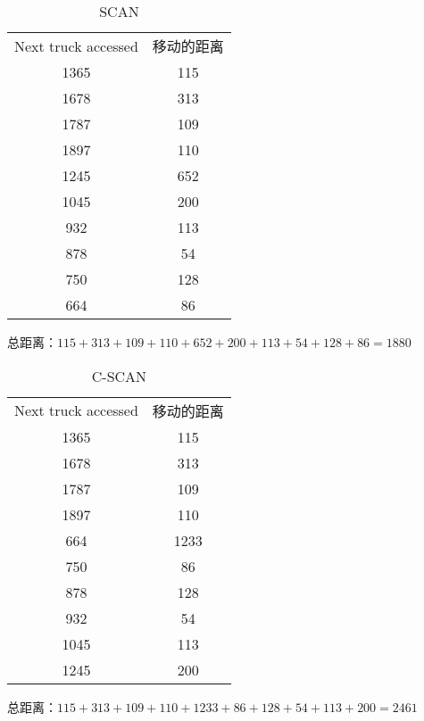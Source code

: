 \documentclass[UTF8]{ctexart}
\begin{document}
    \begin{table}[htb]
        \centering
        \caption{SCAN}
        \begin{tabular}{cc}
            \hline
            Next truck accessed&移动的距离\\
            1365&115\\
            1678&313\\
            1787&109\\
            1897&110\\
            1245&652\\
            1045&200\\
            932&113\\
            878&54\\
            750&128\\
            664&86\\
            \hline
        \end{tabular}
    \end{table}
    总距离：$115+313+109+110+652+200+113+54+128+86=1880$
    \clearpage
    \begin{table}[htb]
        \centering
        \caption{C-SCAN}
        \begin{tabular}{cc}
            \hline
            Next truck accessed&移动的距离\\
            1365&115\\
            1678&313\\
            1787&109\\
            1897&110\\
            664&1233\\
            750&86\\
            878&128\\
            932&54\\
            1045&113\\
            1245&200\\
            \hline
        \end{tabular}
    \end{table}
    总距离：$115+313+109+110+1233+86+128+54+113+200=2461$
\end{document}
